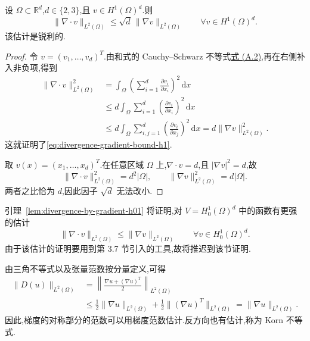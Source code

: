 \begin{lemma}\label{lem:divergence-gradient-bound-h1}
设 $\Omega\subset\mathbb{R}^d$,$d\in\{2,3\}$,且 $v\in H^1(\Omega)^d$.则
\begin{equation}\label{eq:divergence-gradient-bound-h1}
  \|\nabla\cdot v\|_{L^2(\Omega)}
    \le\sqrt d\,\|\nabla v\|_{L^2(\Omega)}
    \qquad\forall v\in H^1(\Omega)^d.
\end{equation}
该估计是锐利的.
\end{lemma}
\begin{proof}
令 $v=(v_1,\ldots,v_d)^T$.由和式的 Cauchy--Schwarz 不等式\hyperref[eq:appendix-a-2]{式 (A.2)},再在右侧补入非负项,得到
\[
\begin{aligned}
  \|\nabla\cdot v\|_{L^2(\Omega)}^2
   &=\int_\Omega\left(\sum_{i=1}^d\frac{\partial v_i}{\partial x_i}\right)^2\,\mathrm{d}x\\
   &\le d\int_\Omega\sum_{i=1}^d
       \left(\frac{\partial v_i}{\partial x_i}\right)^2\,\mathrm{d}x\\
   &\le d\int_\Omega\sum_{i,j=1}^d
       \left(\frac{\partial v_i}{\partial x_j}\right)^2\,\mathrm{d}x
     =d\|\nabla v\|_{L^2(\Omega)}^2.
\end{aligned}
\]
这就证明了\cref{eq:divergence-gradient-bound-h1}.

取 $v(x)=(x_1,\ldots,x_d)^T$.在任意区域 $\Omega$ 上,$\nabla\cdot v=d$,且 $|\nabla v|^2=d$,故
\[
  \|\nabla\cdot v\|_{L^2(\Omega)}^2=d^2|\Omega|,
  \qquad \|\nabla v\|_{L^2(\Omega)}^2=d|\Omega|.
\]
两者之比恰为 $d$,因此因子 $\sqrt d$ 无法改小.
\end{proof}

\begin{note}\label{note:improved-divergence-bound-h01}
引理~\ref{lem:divergence-by-gradient-h01} 将证明,对 $V=H_0^1(\Omega)^d$ 中的函数有更强的估计
\begin{equation}\label{eq:divergence-gradient-bound-h01}
  \|\nabla\cdot v\|_{L^2(\Omega)}
    \le\|\nabla v\|_{L^2(\Omega)}
    \qquad\forall v\in H_0^1(\Omega)^d.
\end{equation}
由于该估计的证明要用到第 3.7 节引入的工具,故将推迟到该节证明.
\end{note}

\begin{note}[用梯度范数估计变形张量范数]\label{note:deformation-gradient-estimate}
由三角不等式以及张量范数按分量定义,可得
\[
\begin{aligned}
  \|D(u)\|_{L^2(\Omega)}
   &=\left\|\frac{\nabla u+(\nabla u)^T}{2}\right\|_{L^2(\Omega)}\\
   &\le\frac12\|\nabla u\|_{L^2(\Omega)}
       +\frac12\|(\nabla u)^T\|_{L^2(\Omega)}
    =\|\nabla u\|_{L^2(\Omega)}.
\end{aligned}
\]
因此,梯度的对称部分的范数可以用梯度范数估计.反方向也有估计,称为 Korn 不等式.
\end{note}

